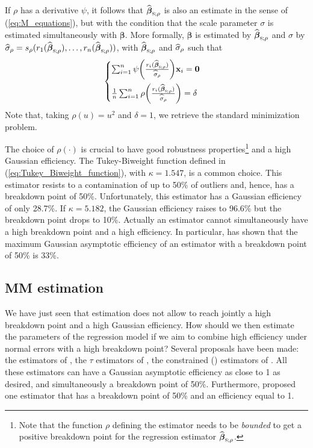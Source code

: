 If $\rho$ has a derivative $\psi$, it follows that
$\sthat{\boldsymbol{\beta}}_{\stsc{S};\rho}$ is also an  estimate in
the sense of (\ref{eq:M_equations}), but with the condition that the scale
parameter $\sigma$ is estimated simultaneously with $\boldsymbol\beta$. More
formally, $\boldsymbol\beta$ is estimated by
$\sthat{\boldsymbol\beta}_{\stsc{S};\rho}$ and $\sigma$ by
$\sthat{\sigma}_{\rho}=s_{\rho}(r_{1}(\sthat{\boldsymbol\beta}_{\stsc{S};\rho}),
 \dots, r_{n}(\sthat{\boldsymbol\beta}_{\stsc{S};\rho}))$, with
$\sthat{\boldsymbol\beta}_{\stsc{S};\rho}$ and $\widehat{\sigma}_{\rho}$ such that
\[
    \begin{cases}
        \sum_{i=1}^{n} 
        \psi\left(\frac{r_{i}(\sthat{\boldsymbol\beta}_{\stsc{S};\rho})}{\sthat{\sigma}_{\rho}}\right) 
        \stvec{x}_{i} = \stvec{0}
        \\[1em]
        \frac{1}{n} \sum_{i=1}^{n}
        \rho\left(\frac{r_{i}(\sthat{\boldsymbol\beta}_{\stsc{S};\rho})}{\sthat{\sigma}_{\rho}}\right)
        = \delta
    \end{cases}
\]
Note that, taking $\rho(u) = u^{2}$ and $\delta=1$, we retrieve
the standard  minimization problem.

The choice of $\rho(\cdot)$ is crucial to have good robustness
properties\footnote{Note that the function $\rho$ defining the 
estimator needs to be \emph{bounded} to get a positive breakdown point for the
regression estimator $\sthat{\boldsymbol\beta}_{\stsc{S};\rho}$.} and a high
Gaussian efficiency. The Tukey-Biweight function defined in
(\ref{eq:Tukey_Biweight_function}), with $\kappa = 1.547$, is a common choice.
This  estimator resists to a contamination of up to 50\% of outliers
and, hence, has a breakdown point of 50\%. Unfortunately, this 
estimator has a Gaussian efficiency of only 28.7\%. If $\kappa = 5.182$, the
Gaussian efficiency raises to 96.6\% but the breakdown point drops to 10\%.
Actually an  estimator cannot simultaneously have a high breakdown
point and a high efficiency. In particular, \citet{Hossjer:1992} has shown that the
maximum Gaussian asymptotic efficiency of an  estimator with a
breakdown point of 50\% is 33\%.

\subsection{MM estimation}
\label{subsec:MM_estimation}

We have just seen that  estimation does not allow to reach jointly a
high breakdown point and a high Gaussian efficiency. How should we then
estimate the parameters of the regression model if we aim to combine high
efficiency under normal errors with a high breakdown point? Several proposals
have been made: the  estimators of \citet{yohai:1987}, the $\tau$
estimators of \citet{Yohai:1988}, the constrained  ()
estimators of \citet{Mendes:1996}. All these estimators can have a Gaussian
asymptotic efficiency as close to 1 as desired, and simultaneously a breakdown
point of 50\%. Furthermore, \citet{Gervini:2002} proposed one estimator that
has a breakdown point of 50\% and an efficiency equal to 1.

